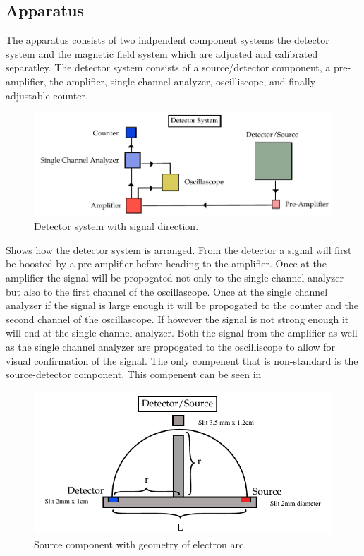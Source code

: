 \subsection{Apparatus}
The apparatus consists of two indpendent component systems the detector system and the magnetic field system which are adjusted and calibrated separatley.  The detector system consists of a source/detector component, a pre-amplifier, the amplifier, single channel analyzer, oscilliscope, and finally adjustable counter.

\begin{figure}[H]
\begin{center}
\includegraphics[width=4 in]{REM-figures.pdf}
\caption{Detector system with signal direction.}
\end{center}
\end{figure}

Shows how the detector system is arranged.  From the detector a signal will first be boosted by a pre-amplifier before heading to the amplifier. Once at the amplifier the signal will be propogated not only to the single channel analyzer but also to the first channel of the  oscillascope.  Once at the single channel analyzer if the signal is large enough it will be propogated to the counter and the second channel of the oscillascope. If however the signal is not strong enough it will end at the single channel analyzer. Both the signal from the amplifier as well as the single channel analyzer are propogated to the oscilliscope to allow for visual confirmation of the signal.  
The only compenent that is non-standard is the source-detector component.  This compenent can be seen in
 
\begin{figure}[H]
\begin{center}
\includegraphics[width=4 in]{REM-figures2.pdf}
\caption{Source component with geometry of electron arc.}
\end{center}
\end{figure}

